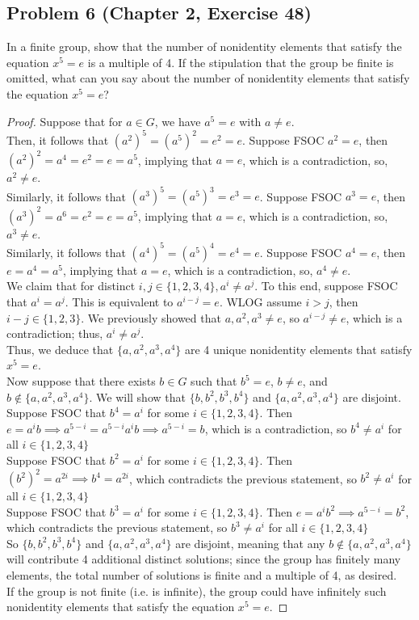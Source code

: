 \documentclass{article}
\begin{document}
\subsection*{Problem 6 (Chapter 2, Exercise 48)}
In a finite group, show that the number of nonidentity elements that satisfy the equation $x^5 = e$ is a multiple of 4. If the stipulation that the group be finite is omitted, what can you say about the number of nonidentity elements that satisfy the equation $x^5 = e$?

\begin{proof}

Suppose that for $a \in G$, we have $a^5 = e$ with $a \neq e$. \\
Then, it follows that $(a^2)^5 = (a^5)^2 = e^2 = e$. Suppose FSOC $a^2 = e$, then $(a^2)^2 = a^4 = e^2 = e = a^5$, implying that $a = e$, which is a contradiction, so, $a^2 \neq e$. \\
Similarly, it follows that $(a^3)^5 = (a^5)^3 = e^3 = e$. Suppose FSOC $a^3 = e$, then $(a^3)^2 = a^6 = e^2 = e = a^5$, implying that $a = e$, which is a contradiction, so, $a^3 \neq e$. \\
Similarly, it follows that $(a^4)^5 = (a^5)^4 = e^4 = e$. Suppose FSOC $a^4 = e$, then $e = a^4 = a^5$, implying that $a = e$, which is a contradiction, so, $a^4 \neq e$. \\
We claim that for distinct $i, j \in \{1, 2, 3, 4\}, a^i \neq a^j$. To this end, suppose FSOC that $a^i = a^j$. This is equivalent to $a^{i-j} = e$. WLOG assume $i > j$, then $i-j \in \{1, 2, 3\}$. We previously showed that $a, a^2, a^3 \neq e$, so $a^{i-j} \neq e$, which is a contradiction; thus, $a^i \neq a^j$. \\
Thus, we deduce that $\{a, a^2, a^3, a^4\}$ are 4 unique nonidentity elements that satisfy $x^5 = e$. \\
Now suppose that there exists $b \in G$ such that $b^5 = e$, $b \neq e$, and $b \notin \{a, a^2, a^3, a^4\}$. We will show that $\{b, b^2, b^3, b^4\}$ and $\{a, a^2, a^3, a^4\}$ are disjoint. \\
Suppose FSOC that $b^4 = a^i$ for some $i \in \{1, 2, 3, 4\}$. Then $e = a^ib \implies a^{5-i}=a^{5-i}a^ib \implies a^{5-i}=b$, which is a contradiction, so $b^4 \neq a^i$ for all $i \in \{1, 2, 3, 4\}$ \\
Suppose FSOC that $b^2 = a^i$ for some $i \in \{1, 2, 3, 4\}$. Then $(b^2)^2 = a^{2i} \implies b^4 = a^{2i}$, which contradicts the previous statement, so $b^2 \neq a^i$ for all $i \in \{1, 2, 3, 4\}$ \\
Suppose FSOC that $b^3 = a^i$ for some $i \in \{1, 2, 3, 4\}$. Then $e = a^ib^2 \implies a^{5-i} = b^2$, which contradicts the previous statement, so $b^3 \neq a^i$ for all $i \in \{1, 2, 3, 4\}$ \\
So $\{b, b^2, b^3, b^4\}$ and $\{a, a^2, a^3, a^4\}$ are disjoint, meaning that any $b \notin \{a, a^2, a^3, a^4\}$ will contribute 4 additional distinct solutions; since the group has finitely many elements, the total number of solutions is finite and a multiple of 4, as desired. \\
If the group is not finite (i.e. is infinite), the group could have infinitely such nonidentity elements that satisfy the equation $x^5 = e$.


\end{proof}
\end{document}
